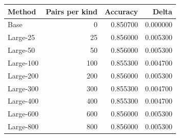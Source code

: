 \begin{tabular}{lrrr}
\toprule
Method & Pairs per kind & Accuracy & Delta \\
\midrule
Base & 0 & 0.850700 & 0.000000 \\
Large-25 & 25 & 0.856000 & 0.005300 \\
Large-50 & 50 & 0.856000 & 0.005300 \\
Large-100 & 100 & 0.855300 & 0.004700 \\
Large-200 & 200 & 0.856000 & 0.005300 \\
Large-300 & 300 & 0.855300 & 0.004700 \\
Large-400 & 400 & 0.855300 & 0.004700 \\
Large-600 & 600 & 0.856000 & 0.005300 \\
Large-800 & 800 & 0.856000 & 0.005300 \\
\bottomrule
\end{tabular}
